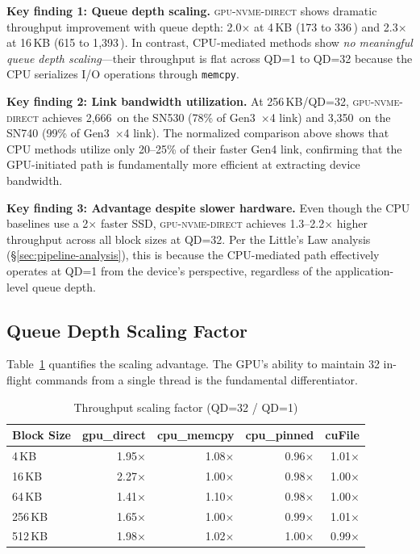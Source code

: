 \documentclass{article}
\newcommand{\sysname}{\textsc{gpu-nvme-direct}}
\newcommand{\MBs}{\,\text{MB/s}}
\begin{document}
\textbf{Key finding 1: Queue depth scaling.} \sysname{} shows dramatic
throughput improvement with queue depth: 2.0$\times$ at 4\,KB (173 to
336\MBs{}) and 2.3$\times$ at 16\,KB (615 to 1{,}393\MBs{}). In contrast,
CPU-mediated methods show \emph{no meaningful queue depth scaling}---their
throughput is flat across QD=1 to QD=32 because the CPU serializes I/O
operations through \texttt{memcpy}.

\textbf{Key finding 2: Link bandwidth utilization.} At 256\,KB/QD=32, \sysname{}
achieves 2{,}666\MBs{} on the SN530 (78\% of Gen3~$\times$4 link) and
3{,}350\MBs{} on the SN740 (99\% of Gen3~$\times$4 link). The normalized
comparison above shows that CPU methods utilize only 20--25\% of their faster
Gen4 link, confirming that the GPU-initiated path is fundamentally more
efficient at extracting device bandwidth.

\textbf{Key finding 3: Advantage despite slower hardware.} Even though the
CPU baselines use a 2$\times$ faster SSD, \sysname{} achieves 1.3--2.2$\times$
higher throughput across all block sizes at QD=32. Per the Little's Law analysis
(\S\ref{sec:pipeline-analysis}), this is because the CPU-mediated path
effectively operates at QD=1 from the device's perspective, regardless of the
application-level queue depth.

\subsection{Queue Depth Scaling Factor}

Table~\ref{tab:scaling} quantifies the scaling advantage. The GPU's ability to
maintain 32 in-flight commands from a single thread is the fundamental
differentiator.

\begin{table}[t]
\centering
\caption{Throughput scaling factor (QD=32 / QD=1)}
\label{tab:scaling}
\small
\begin{tabular}{lrrrr}
\toprule
\textbf{Block Size} & \textbf{gpu\_direct} & \textbf{cpu\_memcpy} & \textbf{cpu\_pinned} & \textbf{cuFile} \\
\midrule
4\,KB   & 1.95$\times$ & 1.08$\times$ & 0.96$\times$ & 1.01$\times$ \\
16\,KB  & 2.27$\times$ & 1.00$\times$ & 0.98$\times$ & 1.00$\times$ \\
64\,KB  & 1.41$\times$ & 1.10$\times$ & 0.98$\times$ & 1.00$\times$ \\
256\,KB & 1.65$\times$ & 1.00$\times$ & 0.99$\times$ & 1.01$\times$ \\
512\,KB & 1.98$\times$ & 1.02$\times$ & 1.00$\times$ & 0.99$\times$ \\
\bottomrule
\end{tabular}
\end{table}
\end{document}
